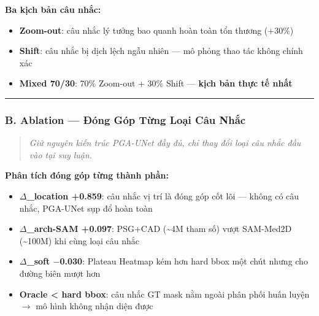 \textbf{Ba kịch bản câu nhắc:}
\begin{itemize}
  \item \textbf{Zoom-out}: câu nhắc lý tưởng bao quanh hoàn toàn tổn thương (+30\%)
  \item \textbf{Shift}: câu nhắc bị dịch lệch ngẫu nhiên — mô phỏng thao tác không chính xác
  \item \textbf{Mixed 70/30}: 70\% Zoom-out + 30\% Shift — \textbf{kịch bản thực tế nhất}
\end{itemize}

\vspace{0.5em}\hrule\vspace{0.5em}


\subsubsection{B. Ablation — Đóng Góp Từng Loại Câu Nhắc}

\begin{quote}\itshape Giữ nguyên kiến trúc PGA-UNet đầy đủ, chỉ thay đổi loại câu nhắc đầu vào tại suy luận.\end{quote}

\begin{table}[htbp]
\centering\renewcommand{\arraystretch}{1.2}
\end{table}

\textbf{Phân tích đóng góp từng thành phần:}
\begin{itemize}
  \item \textbf{$\Delta$\_{}location +0.859}: câu nhắc vị trí là đóng góp cốt lõi --- không có câu nhắc, PGA-UNet sụp đổ hoàn toàn
  \item \textbf{$\Delta$\_{}arch-SAM +0.097}: PSG+CAD (\textasciitilde{}4M tham số) vượt SAM-Med2D (\textasciitilde{}100M) khi cùng loại câu nhắc
  \item \textbf{$\Delta$\_{}soft $-$0.030}: Plateau Heatmap kém hơn hard bbox một chút nhưng cho đường biên mượt hơn
  \item \textbf{Oracle < hard bbox}: câu nhắc GT mask nằm ngoài phân phối huấn luyện $\rightarrow$ mô hình không nhận diện được
\end{itemize}

